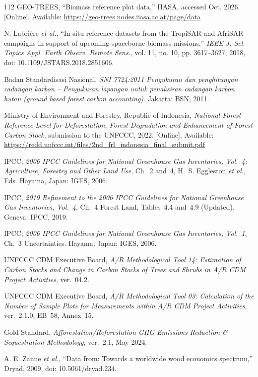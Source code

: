 \documentclass[conference,a4paper]{IEEEtran}
\begin{document}
\begin{thebibliography}{112}
GEO-TREES, ``Biomass reference plot data,'' IIASA, accessed Oct. 2026. [Online]. Available: \url{https://geo-trees.nodes.iiasa.ac.at/page/data}

N. Labri\`ere \textit{et al.}, ``In situ reference datasets from the TropiSAR and AfriSAR campaigns in support of upcoming spaceborne biomass missions,'' \textit{IEEE J. Sel. Topics Appl. Earth Observ. Remote Sens.}, vol. 11, no. 10, pp. 3617--3627, 2018, doi: 10.1109/JSTARS.2018.2851606.

Badan Standardisasi Nasional, \textit{SNI 7724:2011 Pengukuran dan penghitungan cadangan karbon -- Pengukuran lapangan untuk penaksiran cadangan karbon hutan (ground based forest carbon accounting)}. Jakarta: BSN, 2011.

Ministry of Environment and Forestry, Republic of Indonesia, \textit{National Forest Reference Level for Deforestation, Forest Degradation and Enhancement of Forest Carbon Stock}, submission to the UNFCCC, 2022. [Online]. Available: \url{https://redd.unfccc.int/files/2nd_frl_indonesia_final_submit.pdf}

IPCC, \textit{2006 IPCC Guidelines for National Greenhouse Gas Inventories, Vol.~4: Agriculture, Forestry and Other Land Use}, Ch.~2 and~4, H.~S. Eggleston \textit{et al.}, Eds. Hayama, Japan: IGES, 2006.

IPCC, \textit{2019 Refinement to the 2006 IPCC Guidelines for National Greenhouse Gas Inventories, Vol.~4}, Ch.~4 Forest Land, Tables~4.4 and~4.9 (Updated). Geneva: IPCC, 2019.

IPCC, \textit{2006 IPCC Guidelines for National Greenhouse Gas Inventories, Vol.~1}, Ch.~3 Uncertainties. Hayama, Japan: IGES, 2006.

UNFCCC CDM Executive Board, \textit{A/R Methodological Tool 14: Estimation of Carbon Stocks and Change in Carbon Stocks of Trees and Shrubs in A/R CDM Project Activities}, ver.~04.2.

UNFCCC CDM Executive Board, \textit{A/R Methodological Tool 03: Calculation of the Number of Sample Plots for Measurements within A/R CDM Project Activities}, ver.~2.1.0, EB~58, Annex~15.

Gold Standard, \textit{Afforestation/Reforestation GHG Emissions Reduction \& Sequestration Methodology}, ver.~2.1, May 2024.

A. E. Zanne \textit{et al.}, ``Data from: Towards a worldwide wood economics spectrum,'' Dryad, 2009, doi: 10.5061/dryad.234.


\end{thebibliography}
\end{document}
